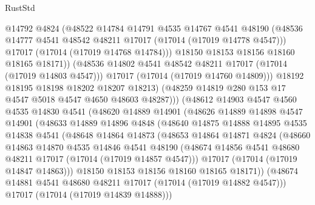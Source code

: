 \begin{lexlean}{RustStd}
\begin{coremodule}
                      @14792
                      @4824
                      (@48522
                        @14784
                        @14791
                        @4535
                        @14767
                        @4541
                        @48190
                        (@48536 @14777 @4541 @48542 @48211 @17017 (@17014 (@17019 @14778 @4547)))
                        @17017
                        (@17014 (@17019 @14768 @14784)))
                      @18150
                      @18153
                      @18156
                      @18160
                      @18165
                      @18171))
                  (@48536 @14802 @4541 @48542 @48211 @17017 (@17014 (@17019 @14803 @4547)))
                  @17017
                  (@17014 (@17019 @14760 @14809)))
                @18192
                @18195
                @18198
                @18202
                @18207
                @18213)
              (@48259 @14819 @280 @153 @17 @4547 @5018 @4547 @4650 @48603 @48287)))
          (@48612
            @14903
            @4547
            @4560
            @4535
            @14830
            @4541
            (@48620
              @14889
              @14901
              (@48626
                @14889
                @14898
                @4547
                @14901
                (@48633
                  @14889
                  @14896
                  @4848
                  (@48640
                    @14875
                    @14888
                    @14895
                    @4535
                    @14838
                    @4541
                    (@48648
                      @14864
                      @14873
                      (@48653
                        @14864
                        @14871
                        @4824
                        (@48660
                          @14863
                          @14870
                          @4535
                          @14846
                          @4541
                          @48190
                          (@48674 @14856 @4541 @48680 @48211 @17017 (@17014 (@17019 @14857 @4547)))
                          @17017
                          (@17014 (@17019 @14847 @14863)))
                        @18150
                        @18153
                        @18156
                        @18160
                        @18165
                        @18171))
                    (@48674 @14881 @4541 @48680 @48211 @17017 (@17014 (@17019 @14882 @4547)))
                    @17017
                    (@17014 (@17019 @14839 @14888)))

\end{coremodule}
\end{lexlean}
